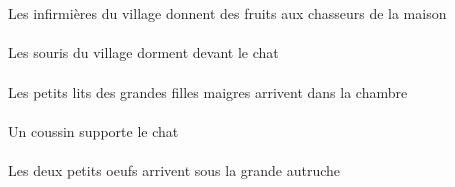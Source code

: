 \begin{exe}
\ex\gll
\DEFSgObl{}   \maisonDSgObl{}   \DE{}   \DEFPlErg{}    \DEFSgObl{}   \villageASgObl{}   \DE{}   \infirmiereBPlErg{}    \DEFPlDat{}   \chasseurCPlDat{}   \INDPlAbs{}   \fruitBPlAbs{}  \donnerVdPrsBPl{}\\
\DEFSgOblP{}   \maisonDSgOblP{}   \DEP{}   \DEFPlErgP{}    \DEFSgOblP{}   \villageASgOblP{}   \DEP{}   \infirmiereBPlErgP{}    \DEFPlDatP{}   \chasseurCPlDatP{}   \INDPlAbsP{}   \fruitBPlAbsP{}  \donnerVdPrsBPlP{}\\
Les infirmières du village donnent des fruits aux chasseurs de la maison
\ex\gll
\DEFPlAbs{}    \DEFSgObl{}   \villageASgObl{}   \DE{}   \sourisAPlAbs{}    \DEFSgObl{}   \chatDSgObl{}   \DEVANT{}  \dormirViPrsAPl{}\\
\DEFPlAbsP{}    \DEFSgOblP{}   \villageASgOblP{}   \DEP{}   \sourisAPlAbsP{}    \DEFSgOblP{}   \chatDSgOblP{}   \DEVANTP{}  \dormirViPrsAPlP{}\\
Les souris du village dorment devant le chat
\ex\gll
\DEFPlAbs{}    \DEFPlObl{}   \grandCPl{}   \maigreCPl{}   \filleCPlObl{}   \DE{}   \petitDPl{}   \litDPlAbs{}    \DEFSgObl{}   \chambreBSgObl{}   \DANS{}  \arriverViPrsDPl{}\\
\DEFPlAbsP{}    \DEFPlOblP{}   \grandCPlP{}   \maigreCPlP{}   \filleCPlOblP{}   \DEP{}   \petitDPlP{}   \litDPlAbsP{}    \DEFSgOblP{}   \chambreBSgOblP{}   \DANSP{}  \arriverViPrsDPlP{}\\
Les petits lits des grandes filles maigres arrivent dans la chambre
\ex\gll
\INDSgErg{}   \coussinASgErg{}   \DEFSgAbs{}   \chatDSgAbs{}  \supporterVtPrsDSg{}\\
\INDSgErgP{}   \coussinASgErgP{}   \DEFSgAbsP{}   \chatDSgAbsP{}  \supporterVtPrsDSgP{}\\
Un coussin supporte le chat
\ex\gll
\DEFDuAbs{}   \petitDDu{}   \oeufDDuAbs{}    \DEFSgObl{}   \grandDSg{}   \autrucheDSgObl{}   \SOUS{}  \arriverViPrsDDu{}\\
\DEFDuAbsP{}   \petitDDuP{}   \oeufDDuAbsP{}    \DEFSgOblP{}   \grandDSgP{}   \autrucheDSgOblP{}   \SOUSP{}  \arriverViPrsDDuP{}\\
Les deux petits oeufs arrivent sous la grande autruche
\ex\gll
\DEFSgObl{}   \cuisineCSgObl{}   \DANS{}   \DEMPlErg{}   \troisDPl{}   \chatDPlErg{}   \DEFSgAbs{}    \INDSgObl{}   \KatishaASgObl{}   \DE{}   \theBSgAbs{}  \boireVtPstBSg{}\\
\DEFSgOblP{}   \cuisineCSgOblP{}   \DANSP{}   \DEMPlErgP{}   \troisDPlP{}   \chatDPlErgP{}   \DEFSgAbsP{}    \INDSgOblP{}   \KatishaASgOblP{}   \DEP{}   \theBSgAbsP{}  \boireVtPstBSgP{}\\

\end{exe}
